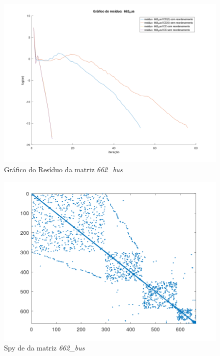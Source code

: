 \begin{figure}[H]
    \centering
         \centering
         \includegraphics[width=.6\linewidth]{images/662_bus.png}
         \caption{Gráfico do Resíduo da matriz \textit{662\_bus}}
         \label{fig:bus-res}
\end{figure}

\begin{figure}[H]
    \centering
         \centering
         \includegraphics[width=.5\linewidth]{images/662_bus_spyA.png}
         \caption{Spy de da matriz \textit{662\_bus}}
         \label{fig:bus-spy-a}
\end{figure}

